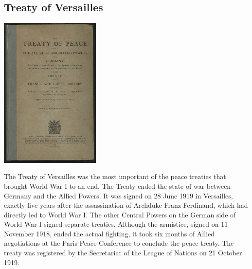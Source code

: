 \documentclass[11pt]{report}
\begin{document}
\subsection{Treaty of Versailles}
\vspace{2mm}\begin{center}\includegraphics[width=5cm]{./img/treatyOfVersailles.jpg}\end{center}
The Treaty of Versailles was the most important of the peace treaties that brought World War I to an end. The Treaty ended the state of war between Germany and the Allied Powers. It was signed on 28 June 1919 in Versailles, exactly five years after the assassination of Archduke Franz Ferdinand, which had directly led to World War I. The other Central Powers on the German side of World War I signed separate treaties. Although the armistice, signed on 11 November 1918, ended the actual fighting, it took six months of Allied negotiations at the Paris Peace Conference to conclude the peace treaty. The treaty was registered by the Secretariat of the League of Nations on 21 October 1919.
\section{}
\end{document}
